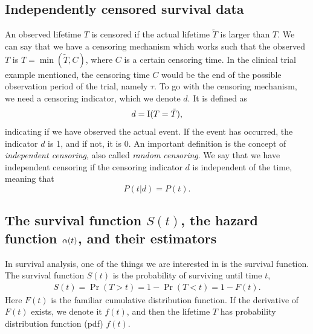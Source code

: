 \subsection{Independently censored survival data}\label{subsec:survdata}
An observed lifetime $T$ is censored if the actual lifetime $\tilde{T}$ is larger than $T$.
We can say that we have a censoring mechanism which works such that the observed $T$ is $T=\min(\tilde{T}, C)$, where $C$ is a certain censoring time.
In the clinical trial example mentioned, the censoring time $C$ would be the end of the possible observation period of the trial, namely $\tau$.
To go with the censoring mechanism, we need a censoring indicator, which we denote $d$.
It is defined as
\begin{equation}\label{eq:censoring}
    d=\operatorname{I}(T=\tilde{T}),
\end{equation}
indicating if we have observed the actual event. If the event has occurred, the indicator $d$ is 1, and if not, it is 0.
An important definition is the concept of \textit{independent censoring}, also called \textit{random censoring}.
We say that we have independent censoring if the censoring indicator $d$ is independent of the time, meaning that
\begin{equation*}
    P(t|d)=P(t).
\end{equation*}

\subsection{The survival function $S(t)$, the hazard function $\alpha(t)$, and their estimators}
In survival analysis, one of the things we are interested in is the survival function. The survival function $S(t)$ is the probability of surviving until time $t$,
\begin{align*}
    S(t)=\Pr(T>t)=1-\Pr(T<t)=1-F(t).
\end{align*}
Here $F(t)$ is the familiar cumulative distribution function.
If the derivative of $F(t)$ exists, we denote it $f(t)$, and then the lifetime $T$ has probability distribution function (pdf) $f(t)$.

